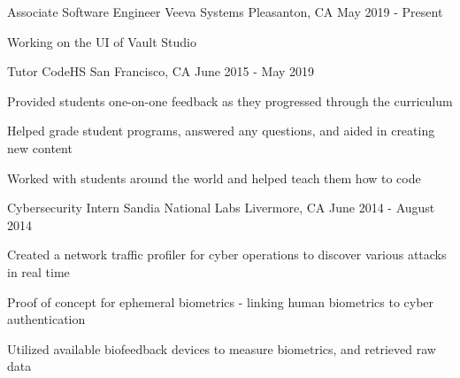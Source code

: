 

\begin{cventries}

  \cventry
    {Associate Software Engineer} %
    {Veeva Systems} %
    {Pleasanton, CA} %
    {May 2019 - Present} %
    {
      \begin{cvitems} %
      \item {Working on the UI of Vault Studio}
      \end{cvitems}
    }


  \cventry
    {Tutor} %
    {CodeHS} %
    {San Francisco, CA} %
    {June 2015 - May 2019} %
    {
      \begin{cvitems} %
      \item {Provided students one-on-one feedback as they progressed through the curriculum}
      \item {Helped grade student programs, answered any questions, and aided in creating new content}
      \item {Worked with students around the world and helped teach them how to code}
      \end{cvitems}
    }

  \cventry
    {Cybersecurity Intern} %
    {Sandia National Labs} %
    {Livermore, CA} %
    {June 2014 - August 2014} %
    {
      \begin{cvitems} %
      \item {Created a network traffic profiler for cyber operations to discover various attacks in real time}
      \item {Proof of concept for ephemeral biometrics - linking human biometrics to cyber authentication}
      \item {Utilized available biofeedback devices to measure biometrics, and retrieved raw data}
      \end{cvitems}
    }


\end{cventries}
